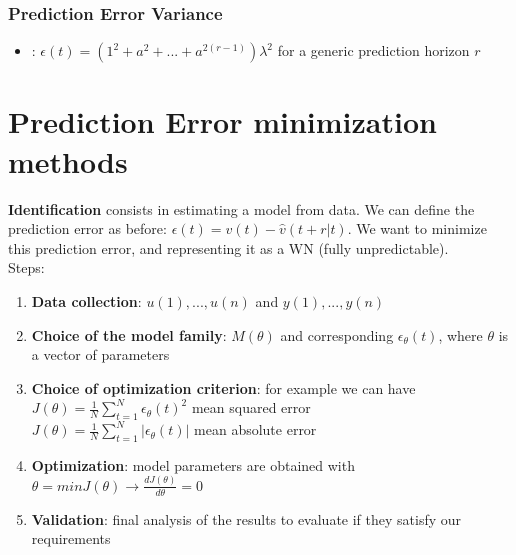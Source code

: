 \documentclass[10pt,a4paper]{article}
\begin{document}
\subsubsection{Prediction Error Variance}
\begin{itemize}
	\item {}: $\epsilon(t)=(1^2+a^2+...+a^{2(r-1)})\lambda^2$ for a generic prediction horizon $r$
\end{itemize}
\section{Prediction Error minimization methods}
\textbf{Identification} consists in estimating a model from data. We can define the prediction error as before: $\epsilon(t)=v(t)-\hat{v}(t+r|t)$. We want to minimize this prediction error, and representing it as a WN (fully unpredictable). \\
Steps:
\begin{enumerate}
	\item \textbf{Data collection}: ${u(1),...,u(n)}$ and ${y(1),...,y(n)}$
	\item \textbf{Choice of the model family}: $M(\theta)$ and corresponding $\epsilon_\theta(t)$, where $\theta$ is a vector of parameters
	\item \textbf{Choice of optimization criterion}: for example we can have
	\center
		$J(\theta)=\frac{1}{N}\sum_{t=1}^{N}\epsilon_\theta(t)^2$ mean squared error \\
		$J(\theta)=\frac{1}{N}\sum_{t=1}^{N}|\epsilon_\theta(t)|$ mean absolute error \\
	\raggedright
	
	\item \textbf{Optimization}: model parameters are obtained with $\theta=minJ(\theta) \rightarrow \frac{dJ(\theta)}{d\theta} = 0$
	\item \textbf{Validation}: final analysis of the results to evaluate if they satisfy our requirements
\end{enumerate}
\end{document}
